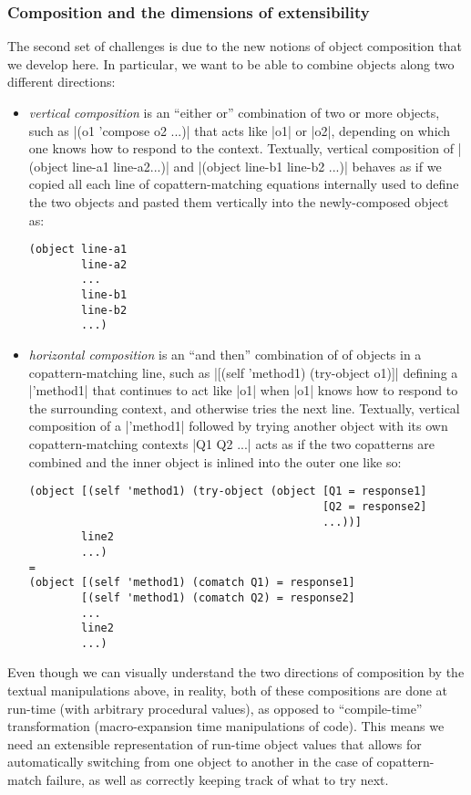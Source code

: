 \subsubsection{Composition and the dimensions of extensibility}
\label{sec:composition-challenges}

The second set of challenges is due to the new notions of object composition that we develop here.
In particular, we want to be able to combine objects along two different directions:
\begin{itemize}
\item
  \emph{vertical composition} is an ``either or'' combination of two or more objects, such as \scm|(o1 'compose o2 ...)| that acts like \scm|o1| or \scm|o2|, \etc[,] depending on which one knows how to respond to the context.
  Textually, vertical composition of \scm|(object line-a1 line-a2...)| and \scm|(object line-b1 line-b2 ...)| behaves as if we copied all each line of copattern-matching equations internally used to define the two objects and pasted them vertically into the newly-composed object as:
\begin{verbatim}
(object line-a1
        line-a2
        ...
        line-b1
        line-b2
        ...)
\end{verbatim}
\item
  \emph{horizontal composition} is an ``and then'' combination of of objects in a copattern-matching line, such as \scm|[(self 'method1) (try-object o1)]| defining a \scm|'method1| that continues to act like \scm|o1| when \scm|o1| knows how to respond to the surrounding context, and otherwise tries the next line.
  Textually, vertical composition of a \scm|'method1| followed by trying another object with its own copattern-matching contexts \scm|Q1 Q2 ...| acts as if the two copatterns are combined and the inner object is inlined into the outer one like so:
\begin{verbatim}
(object [(self 'method1) (try-object (object [Q1 = response1]
                                             [Q2 = response2]
                                             ...))]
        line2
        ...)
=
(object [(self 'method1) (comatch Q1) = response1]
        [(self 'method1) (comatch Q2) = response2]
        ...
        line2
        ...)
\end{verbatim}
\end{itemize}

Even though we can visually understand the two directions of composition by the textual manipulations above, in reality, both of these compositions are done at run-time (\ie with arbitrary procedural values), as opposed to ``compile-time'' transformation (\ie macro-expansion time manipulations of code).
This means we need an extensible representation of run-time object values that allows for automatically switching from one object to another in the case of copattern-match failure, as well as correctly keeping track of what to try next.

